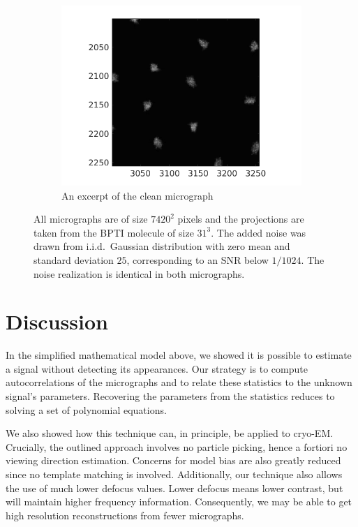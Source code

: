 \documentclass[12pt]{article}
\newcommand{\1}{\mathbf{1}}
\theoremstyle{plain}
\theoremstyle{definition}
\theoremstyle{remark}
\theoremstyle{plain}
\theoremstyle{remark}
\theoremstyle{plain}
\theoremstyle{plain}
\begin{document}
\begin{figure}[h]
	\begin{subfigure}[t]{0.3\textwidth}
		\centering
		\includegraphics[scale=0.4]{clean_micrograph_cutout.png}
		\caption{An excerpt of the clean micrograph}
	\end{subfigure}
	\caption{\label{fig:cryo_detection} All micrographs are of size $7420^2$ pixels and the projections are taken from the BPTI molecule of size $31^3$. The added noise was drawn from i.i.d.\ Gaussian distribution with zero mean and standard deviation $25$, corresponding to an SNR below $1/1024$.  
		The noise realization is identical in both micrographs.} 
\end{figure}


\section{Discussion}

In the simplified mathematical model above, we showed it is possible to estimate a signal without detecting its appearances.  
Our strategy is to compute autocorrelations of the micrographs and to relate these statistics to the unknown signal's parameters. Recovering the parameters from the statistics reduces to solving a set of polynomial equations. 

We also showed how this technique can, in principle, be applied to cryo-EM.
Crucially, the outlined approach involves no particle picking, hence a fortiori no viewing direction estimation. Concerns for model bias are also greatly reduced since no template matching is involved.
Additionally,  our technique also allows the use of much lower defocus values. Lower defocus means lower contrast, but will maintain  higher frequency information. Consequently, we may be able to get high resolution reconstructions from fewer micrographs.
\end{document}

